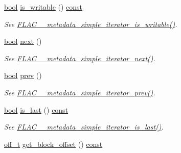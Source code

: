 \begin{DoxyCompactItemize}
\hyperlink{mac_2config_2i386_2lib-src_2libsoxr_2soxr-config_8h_abb452686968e48b67397da5f97445f5b}{bool} \hyperlink{class_f_l_a_c_1_1_metadata_1_1_simple_iterator_aef81191b644d6c0faade9da888301bcd}{is\+\_\+writable} () \hyperlink{getopt1_8c_a2c212835823e3c54a8ab6d95c652660e}{const} 
\begin{DoxyCompactList}\small\item\em See \hyperlink{group__flac__metadata__level1_gadc654c1361b53737bab20efa3e75a0fc}{F\+L\+A\+C\+\_\+\+\_\+metadata\+\_\+simple\+\_\+iterator\+\_\+is\+\_\+writable()}. \end{DoxyCompactList}\item 
\hyperlink{mac_2config_2i386_2lib-src_2libsoxr_2soxr-config_8h_abb452686968e48b67397da5f97445f5b}{bool} \hyperlink{class_f_l_a_c_1_1_metadata_1_1_simple_iterator_ab399f6b8c5e35a1d18588279613ea63c}{next} ()
\begin{DoxyCompactList}\small\item\em See \hyperlink{group__flac__metadata__level1_gacac860d14fc0ff37cc2c034d3f972320}{F\+L\+A\+C\+\_\+\+\_\+metadata\+\_\+simple\+\_\+iterator\+\_\+next()}. \end{DoxyCompactList}\item 
\hyperlink{mac_2config_2i386_2lib-src_2libsoxr_2soxr-config_8h_abb452686968e48b67397da5f97445f5b}{bool} \hyperlink{class_f_l_a_c_1_1_metadata_1_1_simple_iterator_a75a859af156322f451045418876eb6a3}{prev} ()
\begin{DoxyCompactList}\small\item\em See \hyperlink{group__flac__metadata__level1_ga49f495dec0f44116d66e1b79356a1160}{F\+L\+A\+C\+\_\+\+\_\+metadata\+\_\+simple\+\_\+iterator\+\_\+prev()}. \end{DoxyCompactList}\item 
\hyperlink{mac_2config_2i386_2lib-src_2libsoxr_2soxr-config_8h_abb452686968e48b67397da5f97445f5b}{bool} \hyperlink{class_f_l_a_c_1_1_metadata_1_1_simple_iterator_af3bd51827d4768d9ee1a244c157490b9}{is\+\_\+last} () \hyperlink{getopt1_8c_a2c212835823e3c54a8ab6d95c652660e}{const} 
\begin{DoxyCompactList}\small\item\em See \hyperlink{group__flac__metadata__level1_ga4dd81539fb698163209d05af13a2ec3c}{F\+L\+A\+C\+\_\+\+\_\+metadata\+\_\+simple\+\_\+iterator\+\_\+is\+\_\+last()}. \end{DoxyCompactList}\item 
\hyperlink{macconfig_8h_ae498af04567b740d66e09d36613c2cd8}{off\+\_\+t} \hyperlink{class_f_l_a_c_1_1_metadata_1_1_simple_iterator_ae347bb1435a83a389672079833ac9ebe}{get\+\_\+block\+\_\+offset} () \hyperlink{getopt1_8c_a2c212835823e3c54a8ab6d95c652660e}{const} 

\end{DoxyCompactItemize}
